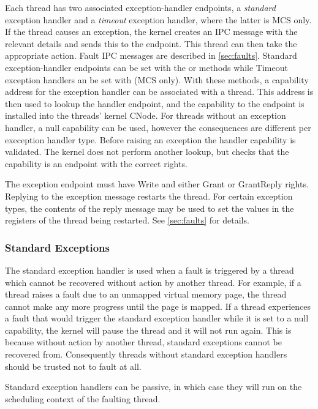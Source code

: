 Each thread has two associated exception-handler endpoints, a \emph{standard}
exception handler and a \emph{timeout} exception handler, where the latter is MCS
only. If the thread causes
an exception, the kernel creates an IPC message with the relevant details and
sends this to the endpoint. This thread can then take the appropriate action.
Fault IPC messages are described in \autoref{sec:faults}.  Standard exception-handler
endpoints can be set with the  or
 methods while Timeout exception
handlers an be set with  (MCS only).
With these methods, a
capability address for the exception handler can be associated with a thread.
This address is then used to lookup the handler endpoint, and the capability to
the endpoint is installed into the threads' kernel CNode.  For threads without
an exception handler, a null capability can be used, however the consequences
are different per exeception handler type.  Before raising an exception the
handler capability is validated. The kernel does not perform another lookup,
but checks that the capability is an endpoint with the correct rights.

The exception endpoint must have Write and either Grant or GrantReply rights.
Replying to the exception message restarts the thread. For certain exception
types, the contents of the reply message may be used to set the values in the
registers of the thread being restarted.  See \autoref{sec:faults} for details.

\subsubsection{Standard Exceptions}

The standard exception handler is used when a fault is triggered by a thread
which cannot be recovered without action by another thread.  For example, if a
thread raises a fault due to an unmapped virtual memory page, the thread cannot
make any more progress until the page is mapped.  If a thread experiences a
fault that would trigger the standard exception handler while it is set to a
null capability, the kernel will pause the thread and it will not run again.
This is because without action by another thread, standard exceptions cannot be
recovered from.  Consequently threads without standard exception handlers
should be trusted not to fault at all.

Standard exception handlers can be passive, in which case they will run on the
scheduling context of the faulting thread.


